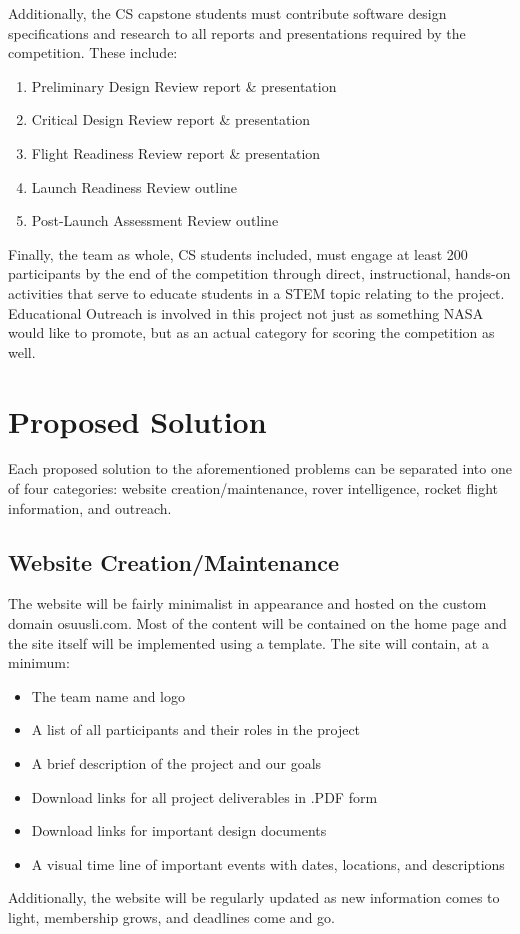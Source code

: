 \documentclass[onecolumn, draftclsnofoot,10pt, compsoc]{IEEEtran}
\begin{document}
Additionally, the CS capstone students must contribute software design specifications and research to all reports and presentations required by the competition. 
These include:
\begin{enumerate}
\item Preliminary Design Review report \& presentation
\item Critical Design Review report \& presentation
\item Flight Readiness Review report \& presentation
\item Launch Readiness Review outline
\item Post-Launch Assessment Review outline
\end{enumerate}
\par Finally, the team as whole, CS students included, must engage at least 200 participants by the end of the competition through direct, instructional, hands-on activities that serve to educate students in a STEM topic relating to the project. Educational Outreach is involved in this project not just as something NASA would like to promote, but as an actual category for scoring the competition as well.
\section{Proposed Solution}
Each proposed solution to the aforementioned problems can be separated into one of four categories: website creation/maintenance, rover intelligence, rocket flight information, and outreach.
\subsection{Website Creation/Maintenance}
The website will be fairly minimalist in appearance and hosted on the custom domain osuusli.com. Most of the content will be contained on the home page and the site itself will be implemented using a template. The site will contain, at a minimum:
\begin{itemize}
\item The team name and logo
\item A list of all participants and their roles in the project
\item A brief description of the project and our goals
\item Download links for all project deliverables in .PDF form
\item Download links for important design documents
\item A visual time line of important events with dates, locations, and descriptions
\end{itemize}
\par Additionally, the website will be regularly updated as new information comes to light, membership grows, and deadlines come and go.
\end{document}
